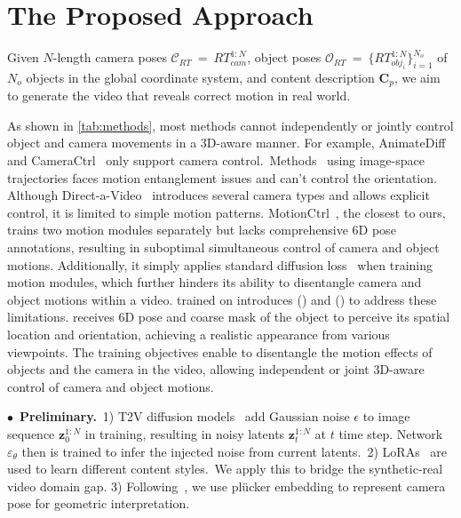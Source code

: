 \section{The Proposed Approach}\label{sec:approach}
Given $N$-length camera poses $\mathcal{C}_{RT}$~=~${RT}_{cam}^{1:N}$, object poses $\mathcal{O}_{RT}$~=~$\{RT_{obj_i}^{1:N}\}_{i=1}^{N_o}$ of $N_o$ objects in the global coordinate system, and content description $\mathbf{C}_p$, we aim to generate the video that reveals correct motion in real world. 


As shown in \cref{tab:methods}, most methods cannot independently or jointly control object and camera movements in a 3D-aware manner. For example, AnimateDiff~\cite{AnimateDiff} and CameraCtrl~\cite{CameraCtrl} only support camera control.~Methods~\cite{VideoComposer,DragNUWA,Direct-A-Video,MotionCtrl} using image-space trajectories faces motion entanglement issues and can't control the orientation. Although Direct-a-Video~\cite{Direct-A-Video} introduces several camera types and allows explicit control, it is limited to simple motion patterns. MotionCtrl~\cite{MotionCtrl}, the closest to ours, trains two motion modules separately but lacks comprehensive 6D pose annotations, resulting in suboptimal simultaneous control of camera and object motions. Additionally, it simply applies standard diffusion loss~\cite{Diffusion} when training motion modules, which further hinders its ability to disentangle camera and object motions within a video. \methodname trained on \datasetname introduces \camctrlcompletename (\camctrlname) and \objctrlcompletename (\objctrlname) to address these limitations. \objctrlname receives 6D pose and coarse mask of the object to perceive its spatial location and orientation, achieving a realistic appearance from various viewpoints. The training objectives enable \methodname to disentangle the motion effects of objects and the camera in the video, allowing independent or joint 3D-aware control of camera and object motions.


\noindent$\bullet$~\textbf{{Preliminary}.}~{1)} T2V diffusion models~\cite{AnimateDiff,Imagen-Video,I2VGen-XL,MAGVIT,Make-A-Video,VDM} add Gaussian noise $\epsilon$ to image sequence $\mathbf{z}_0^{1:N}$ in training, resulting in noisy latents $\mathbf{z}_t^{1:N}$ at $t$ time step. Network $\varepsilon_{\theta}$ then is trained to infer the injected noise from current latents.~2) LoRAs~\cite{LoRA,AnimateDiff} are used to learn different content styles.~We apply this to bridge the synthetic-real video domain gap. {3)} Following~\cite{CameraCtrl}, we use {pl\"ucker embedding} to represent camera pose for geometric interpretation.


